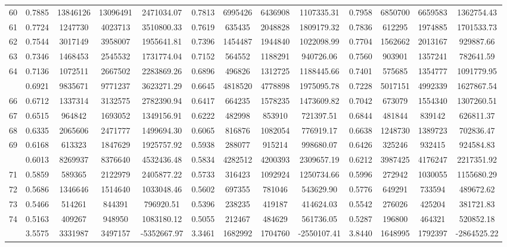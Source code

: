 \documentclass[
  12pt,
]{article}
\begin{document}
\begin{longtable}[t]{lcccccccccccc}
60 & 0.7885 & 13846126 & 13096491 & 2471034.07 & 0.7813 & 6995426 & 6436908 & 1107335.31 & 0.7958 & 6850700 & 6659583 & 1362754.43\\
61 & 0.7724 & 1247730 & 4023713 & 3510800.33 & 0.7619 & 635435 & 2048828 & 1809179.32 & 0.7836 & 612295 & 1974885 & 1701533.73\\
62 & 0.7544 & 3017149 & 3958007 & 1955641.81 & 0.7396 & 1454487 & 1944840 & 1022098.99 & 0.7704 & 1562662 & 2013167 & 929887.66\\
63 & 0.7346 & 1468453 & 2545532 & 1731774.04 & 0.7152 & 564552 & 1188291 & 940726.06 & 0.7560 & 903901 & 1357241 & 782641.59\\
64 & 0.7136 & 1072511 & 2667502 & 2283869.26 & 0.6896 & 496826 & 1312725 & 1188445.66 & 0.7401 & 575685 & 1354777 & 1091779.95\\
\addlinespace
65 & 0.6921 & 9835671 & 9771237 & 3623271.29 & 0.6645 & 4818520 & 4778898 & 1975095.78 & 0.7228 & 5017151 & 4992339 & 1627867.54\\
66 & 0.6712 & 1337314 & 3132575 & 2782390.94 & 0.6417 & 664235 & 1578235 & 1473609.82 & 0.7042 & 673079 & 1554340 & 1307260.51\\
67 & 0.6515 & 964842 & 1693052 & 1349156.91 & 0.6222 & 482998 & 853910 & 721397.51 & 0.6844 & 481844 & 839142 & 626811.37\\
68 & 0.6335 & 2065606 & 2471777 & 1499694.30 & 0.6065 & 816876 & 1082054 & 776919.17 & 0.6638 & 1248730 & 1389723 & 702836.47\\
69 & 0.6168 & 613323 & 1847629 & 1925757.92 & 0.5938 & 288077 & 915214 & 998680.07 & 0.6426 & 325246 & 932415 & 924584.83\\
\addlinespace
70 & 0.6013 & 8269937 & 8376640 & 4532436.48 & 0.5834 & 4282512 & 4200393 & 2309657.19 & 0.6212 & 3987425 & 4176247 & 2217351.92\\
71 & 0.5859 & 589365 & 2122979 & 2405877.22 & 0.5733 & 316423 & 1092924 & 1250734.66 & 0.5996 & 272942 & 1030055 & 1155680.29\\
72 & 0.5686 & 1346646 & 1514640 & 1033048.46 & 0.5602 & 697355 & 781046 & 543629.90 & 0.5776 & 649291 & 733594 & 489672.62\\
73 & 0.5466 & 514261 & 844391 & 796920.51 & 0.5396 & 238235 & 419187 & 414624.03 & 0.5542 & 276026 & 425204 & 381721.83\\
74 & 0.5163 & 409267 & 948950 & 1083180.12 & 0.5055 & 212467 & 484629 & 561736.05 & 0.5287 & 196800 & 464321 & 520852.18\\
\addlinespace
75 & 3.5575 & 3331987 & 3497157 & -5352667.97 & 3.3461 & 1682992 & 1704760 & -2550107.41 & 3.8440 & 1648995 & 1792397 & -2864525.22\\*
\end{longtable}
\endgroup{}
\end{document}

